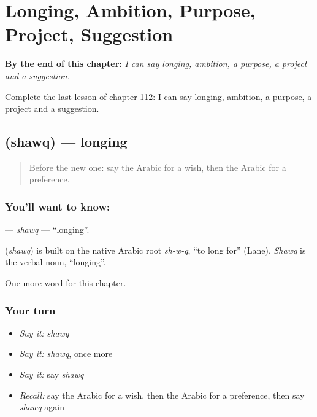 
\chapter{Longing, Ambition, Purpose, Project, Suggestion}
\label{ch:ar-longing-ambition-purpose-project-suggestion}

\begin{chapteropening}
\textbf{By the end of this chapter:} \emph{I can say longing, ambition, a purpose, a project and a suggestion.}

Complete the last lesson of chapter 112: I can say longing, ambition, a purpose, a project and a suggestion.
\end{chapteropening}

\section[\texorpdfstring{\ar{شوق} (shawq)}{شوق (shawq)}]{ (shawq) — longing}

\label{lesson:AR-C112-shawq}



\begin{quote}
Before the new one: say the Arabic for a wish, then the Arabic for a preference.
\end{quote}

\subsection*{You'll want to know: }
\textbf{} — \emph{shawq} — \textquotedblleft{}longing\textquotedblright{}.

\begin{cousinweb}
\textbf{} (\emph{shawq}) is built on the native Arabic root \emph{sh-w-q}, \textquotedblleft{}to long for\textquotedblright{} (Lane). \emph{Shawq} is the verbal noun, \textquotedblleft{}longing\textquotedblright{}.
\end{cousinweb}

\begin{grammarlens}[title={What you've built}]
One more word for this chapter.
\end{grammarlens}

\subsection*{Your turn}
\begin{itemize}
\raggedright
  \item \emph{Say it:} \emph{shawq}
  \item \emph{Say it:} \emph{shawq}, once more
  \item \emph{Say it:} say \emph{shawq}
  \item \emph{Recall:} say the Arabic for a wish, then the Arabic for a preference, then say \emph{shawq} again
\end{itemize}


